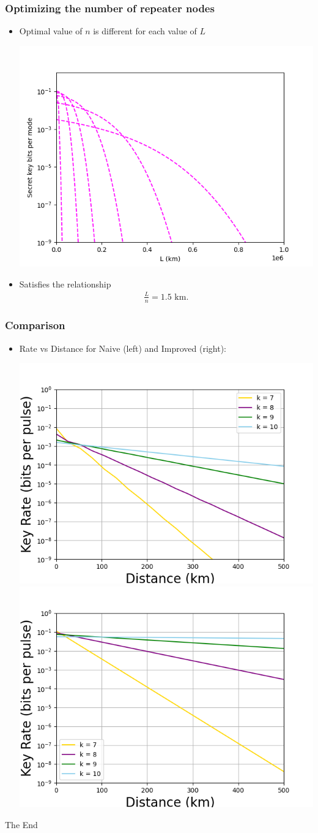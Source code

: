 \documentclass[aspectratio=169,xcolor=dvipsnames]{beamer}
\begin{document}
    \begin{frame}
    \frametitle{Optimizing the number of repeater nodes}
    \begin{itemize}
        \item Optimal value of $n$ is different for each value of $L$
        \begin{center}
            \includegraphics[width=0.5\linewidth]{figs/e_graph.png}
        \end{center}
        \item Satisfies the relationship 
        \begin{align*}
            \frac{L}{n} = 1.5\text{ km}.
        \end{align*}
    \end{itemize}
    \end{frame}
    \begin{frame}
    \frametitle{Comparison}
    \begin{itemize}
        \item Rate vs Distance for Naive (left) and Improved (right):
        \begin{center}
            \includegraphics[width=0.49\linewidth]{figs/3a.png}
            \includegraphics[width=0.49\linewidth]{figs/3b.png}
        \end{center}
    \end{itemize}
    \end{frame}
    
    \begin{frame}
    \Huge{\centerline{The End}}
    \end{frame}
    
    
\end{document}
